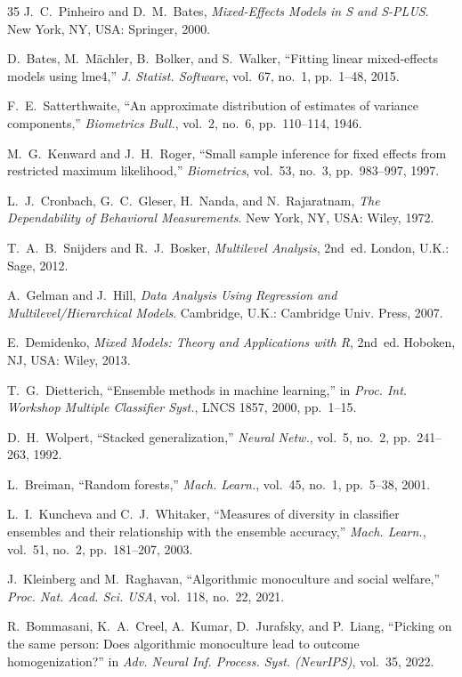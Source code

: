 \documentclass[11pt]{article}
\theoremstyle{definition}
\theoremstyle{plain}
\begin{document}
\begin{thebibliography}{35}
 J.~C.~Pinheiro and D.~M.~Bates, \emph{Mixed-Effects
Models in S and S-PLUS}. New York, NY, USA: Springer, 2000.

 D.~Bates, M.~M\"{a}chler, B.~Bolker, and S.~Walker,
``Fitting linear mixed-effects models using lme4,'' \emph{J. Statist.
Software}, vol.~67, no.~1, pp.~1--48, 2015.

 F.~E.~Satterthwaite, ``An approximate distribution
of estimates of variance components,'' \emph{Biometrics Bull.}, vol.~2, no.~6,
pp.~110--114, 1946.

 M.~G.~Kenward and J.~H.~Roger, ``Small sample inference
for fixed effects from restricted maximum likelihood,'' \emph{Biometrics},
vol.~53, no.~3, pp.~983--997, 1997.

 L.~J.~Cronbach, G.~C.~Gleser, H.~Nanda, and
N.~Rajaratnam, \emph{The Dependability of Behavioral Measurements}. New York, NY,
USA: Wiley, 1972.

 T.~A.~B.~Snijders and R.~J.~Bosker, \emph{Multilevel
Analysis}, 2nd~ed. London, U.K.: Sage, 2012.

 A.~Gelman and J.~Hill, \emph{Data Analysis Using Regression
and Multilevel/Hierarchical Models}. Cambridge, U.K.: Cambridge Univ. Press, 2007.

 E.~Demidenko, \emph{Mixed Models: Theory and Applications
with R}, 2nd~ed. Hoboken, NJ, USA: Wiley, 2013.

 T.~G.~Dietterich, ``Ensemble methods in machine
learning,'' in \emph{Proc. Int. Workshop Multiple Classifier Syst.}, LNCS 1857,
2000, pp.~1--15.

 D.~H.~Wolpert, ``Stacked generalization,'' \emph{Neural
Netw.}, vol.~5, no.~2, pp.~241--263, 1992.

 L.~Breiman, ``Random forests,'' \emph{Mach. Learn.},
vol.~45, no.~1, pp.~5--38, 2001.

 L.~I.~Kuncheva and C.~J.~Whitaker, ``Measures of
diversity in classifier ensembles and their relationship with the ensemble
accuracy,'' \emph{Mach. Learn.}, vol.~51, no.~2, pp.~181--207, 2003.

 J.~Kleinberg and M.~Raghavan, ``Algorithmic monoculture
and social welfare,'' \emph{Proc. Nat. Acad. Sci. USA}, vol.~118, no.~22,
2021.

 R.~Bommasani, K.~A.~Creel, A.~Kumar, D.~Jurafsky, and
P.~Liang, ``Picking on the same person: Does algorithmic monoculture lead to
outcome homogenization?'' in \emph{Adv. Neural Inf. Process. Syst. (NeurIPS)},
vol.~35, 2022.


\end{thebibliography}
\end{document}
